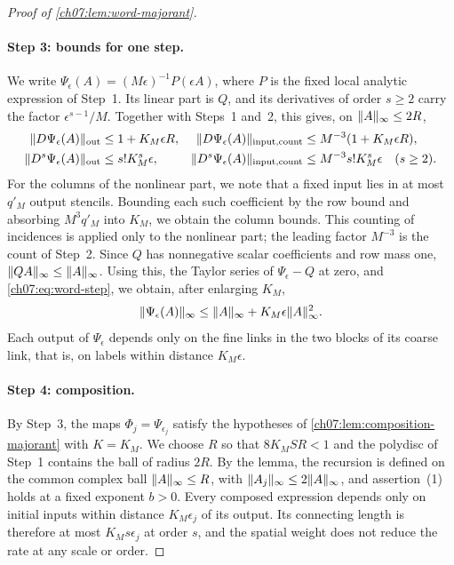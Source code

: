 \begin{proof}[Proof of \cref{ch07:lem:word-majorant}]
\paragraph{Step 3: bounds for one step.}
We write $\Psi_\epsilon(A)=(M\epsilon)^{-1}P(\epsilon A)$, where $P$ is the fixed local analytic expression of Step~1. Its linear part is $Q$, and its derivatives of order $s\ge2$ carry the factor $\epsilon^{s-1}/M$. Together with Steps~1 and~2, this gives, on $\lVert A\rVert_\infty\le2R$,
\begin{equation}\label{ch07:eq:word-step}
 \begin{aligned}
 \lVert D\Psi_\epsilon(A)\rVert_{\mathrm{out}}&\le1+K_M\epsilon R,&
 \lVert D\Psi_\epsilon(A)\rVert_{\mathrm{input,count}}&\le M^{-3}(1+K_M\epsilon R),\\
 \lVert D^s\Psi_\epsilon(A)\rVert_{\mathrm{out}}&\le s!K_M^s\epsilon,&
 \lVert D^s\Psi_\epsilon(A)\rVert_{\mathrm{input,count}}&\le M^{-3}s!K_M^s\epsilon\quad(s\ge2).
 \end{aligned}
\end{equation}
For the columns of the nonlinear part, we note that a fixed input lies in at most $q'_M$ output stencils. Bounding each such coefficient by the row bound and absorbing $M^3q'_M$ into $K_M$, we obtain the column bounds. This counting of incidences is applied only to the nonlinear part; the leading factor $M^{-3}$ is the count of Step~2. Since $Q$ has nonnegative scalar coefficients and row mass one, $\lVert QA\rVert_\infty\le\lVert A\rVert_\infty$. Using this, the Taylor series of $\Psi_\epsilon-Q$ at zero, and \eqref{ch07:eq:word-step}, we obtain, after enlarging $K_M$,
\[
 \lVert \Psi_\epsilon(A)\rVert_\infty\le\lVert A\rVert_\infty+K_M\epsilon\lVert A\rVert_\infty^2 .
\]
Each output of $\Psi_\epsilon$ depends only on the fine links in the two blocks of its coarse link, that is, on labels within distance $K_M\epsilon$.

\paragraph{Step 4: composition.}
By Step~3, the maps $\Phi_j=\Psi_{\epsilon_j}$ satisfy the hypotheses of \cref{ch07:lem:composition-majorant} with $K=K_M$. We choose $R$ so that $8K_MSR<1$ and the polydisc of Step~1 contains the ball of radius $2R$. By the lemma, the recursion is defined on the common complex ball $\lVert A\rVert_\infty\le R$, with $\lVert A_j\rVert_\infty\le2\lVert A\rVert_\infty$, and assertion~(1) holds at a fixed exponent $b>0$. Every composed expression depends only on initial inputs within distance $K_M\epsilon_j$ of its output. Its connecting length is therefore at most $K_Ms\epsilon_j$ at order $s$, and the spatial weight does not reduce the rate at any scale or order.


\end{proof}
